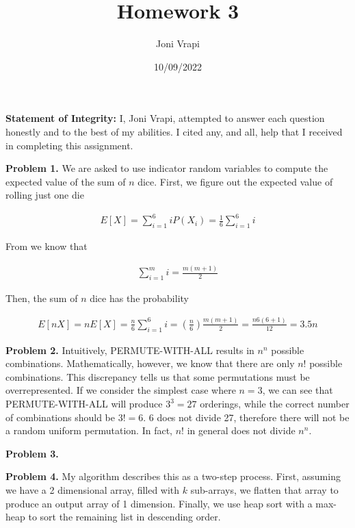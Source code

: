\documentclass{article}
\title{Homework 3}
\author{Joni Vrapi}
\date{10/09/2022}
\begin{document}
\maketitle

\textbf{Statement of Integrity:} I, Joni Vrapi, attempted to answer each question honestly and to the best of my abilities. I cited any, and all, help that I received in completing this assignment.

\hfill

\textbf{Problem 1.} We are asked to use indicator random variables to compute the expected value \cite{website:1} of the sum of $n$ dice. First, we figure out the expected value of rolling just one die

\begin{gather}
    E[X] = \sum_{i = 1}^{6}iP(X_i) = \frac{1}{6}\sum_{i = 1}^{6}i 
\end{gather}

From \cite{website:2} we know that

\begin{gather}
    \sum_{i = 1}^{m}i = \frac{m(m+1)}{2}
\end{gather}

Then, the sum of $n$ dice has the probability

\begin{gather}
    E[nX] = nE[X] = \frac{n}{6}\sum_{i = 1}^{6}i = (\frac{n}{6})\frac{m(m+1)}{2} = \frac{n6(6+1)}{12} = 3.5n
\end{gather}

\hfill

\textbf{Problem 2.} Intuitively, PERMUTE-WITH-ALL results in $n^n$ possible combinations. Mathematically, however, we know that there are only $n!$ possible combinations. This discrepancy tells us that some permutations must be overrepresented. If we consider the simplest case where $n = 3$, we can see that PERMUTE-WITH-ALL will produce $3^3 = 27$ orderings, while the correct number of combinations should be $3! = 6$. 6 does not divide 27, therefore there will not be a random uniform permutation. In fact, $n!$ in general does not divide $n^n$.

\hfill

\textbf{Problem 3.} 

\hfill

\textbf{Problem 4.} My algorithm describes this as a two-step process. First, assuming we have a 2 dimensional array, filled with $k$ sub-arrays, we flatten that array to produce an output array of 1 dimension. Finally, we use heap sort \cite{website:4} with a max-heap to sort the remaining list in descending order. 
\end{document}
